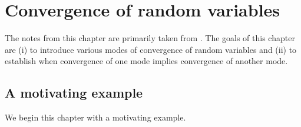 \documentclass[12pt]{book}
\numberwithin{equation}{chapter}
\theoremstyle{plain}
\numberwithin{theorem}{section}
\theoremstyle{definition}
\numberwithin{exercise}{chapter}
\newcommand{\<}{\langle}
\renewcommand{\>}{\rangle}
\renewcommand{\(}{\left(}
\renewcommand{\)}{\right)}
\renewcommand{\[}{\left[}
\renewcommand{\]}{\right]}
\begin{document}

%
%


\chapter{Convergence of random variables}
\label{chapter:convergence}
The notes from this chapter are primarily taken from \cite[Chapter 7]{gs2001}.  The goals of this chapter are (i) to introduce various modes of convergence of random variables and (ii) to establish when convergence of one mode implies convergence of another mode.


\section{A motivating example}
\label{sec:motivation}
We begin this chapter with a motivating example.  
\end{document}
